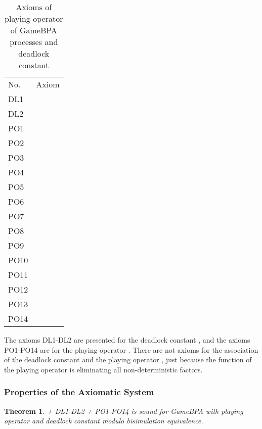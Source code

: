 \documentclass{fac}
\newtheorem{theorem}{Theorem}[section]
\begin{document}
\begin{center}
\begin{table}
  \begin{tabular}{@{}ll@{}}
\hline No. &Axiom\\
  DL1 & \\
  DL2 & \\
  PO1 &  \\
  PO2 &  \\
  PO3 &  \\
  PO4 &  \\
  PO5 &  \\
  PO6 & \\
  PO7 & \\
  PO8 & \\
  PO9 & \\
  PO10 & \\
  PO11 & \\
  PO12 & \\
  PO13 & \\
  PO14 & \\
\end{tabular}
\caption{Axioms of playing operator of GameBPA processes and deadlock constant}
\label{AxiomOfPO}
\end{table}
\end{center}

The axioms DL1-DL2 are presented for the deadlock constant , and the axioms PO1-PO14 are for the playing operator . There are not axioms for the association of the deadlock constant  and the playing operator , just because the function of the playing operator  is eliminating all non-deterministic factors.

\subsubsection{Properties of the Axiomatic System}

\begin{theorem}
 + DL1-DL2 + PO1-PO14  is sound for GameBPA with playing operator and deadlock constant modulo bisimulation equivalence.
\end{theorem}
\end{document}
